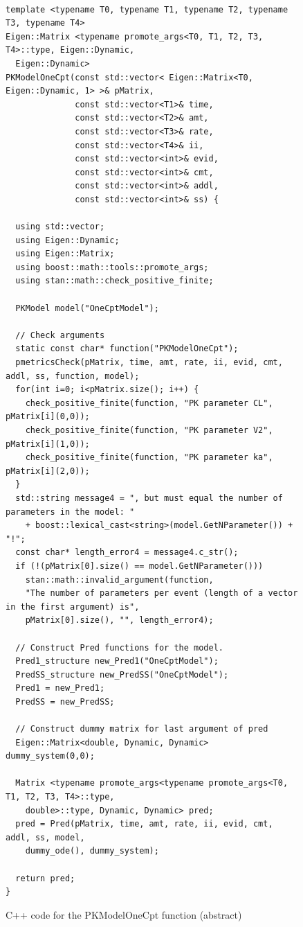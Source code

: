 \documentclass[11pt]{amsart}
\newenvironment{fmpage}[1]
     {\begin{lrbox}{\fmbox}\begin{minipage}{#1}}
     {\end{minipage}\end{lrbox}\fbox{\usebox{\fmbox}}}
\begin{document}
\begin{figure}
\caption{C++ code for the PKModelOneCpt function (abstract)}
\begin{center}
\begin{small}
\begin{fmpage}{\textwidth - .45in}
\begin{lstlisting}[basicstyle=\footnotesize\ttfamily,mathescape=true,flexiblecolumns=true,frame=single,escapeinside=`']

template <typename T0, typename T1, typename T2, typename T3, typename T4> 
Eigen::Matrix <typename promote_args<T0, T1, T2, T3, T4>::type, Eigen::Dynamic,
  Eigen::Dynamic> 
PKModelOneCpt(const std::vector< Eigen::Matrix<T0, Eigen::Dynamic, 1> >& pMatrix, 
			  const std::vector<T1>& time,
			  const std::vector<T2>& amt,
			  const std::vector<T3>& rate,
			  const std::vector<T4>& ii,
			  const std::vector<int>& evid,
			  const std::vector<int>& cmt,
			  const std::vector<int>& addl,
			  const std::vector<int>& ss) {
			  
  using std::vector;
  using Eigen::Dynamic;
  using Eigen::Matrix;
  using boost::math::tools::promote_args;
  using stan::math::check_positive_finite;
  
  PKModel model("OneCptModel"); 
  	 
  // Check arguments
  static const char* function("PKModelOneCpt");
  pmetricsCheck(pMatrix, time, amt, rate, ii, evid, cmt, addl, ss, function, model);
  for(int i=0; i<pMatrix.size(); i++) {
    check_positive_finite(function, "PK parameter CL", pMatrix[i](0,0));
    check_positive_finite(function, "PK parameter V2", pMatrix[i](1,0));
    check_positive_finite(function, "PK parameter ka", pMatrix[i](2,0));
  }
  std::string message4 = ", but must equal the number of parameters in the model: " 
    + boost::lexical_cast<string>(model.GetNParameter()) + "!"; 
  const char* length_error4 = message4.c_str();    
  if (!(pMatrix[0].size() == model.GetNParameter()))
    stan::math::invalid_argument(function,
    "The number of parameters per event (length of a vector in the first argument) is",
    pMatrix[0].size(), "", length_error4);

  // Construct Pred functions for the model.
  Pred1_structure new_Pred1("OneCptModel");
  PredSS_structure new_PredSS("OneCptModel");
  Pred1 = new_Pred1;
  PredSS = new_PredSS; 
  	
  // Construct dummy matrix for last argument of pred
  Eigen::Matrix<double, Dynamic, Dynamic> dummy_system(0,0);

  Matrix <typename promote_args<typename promote_args<T0, T1, T2, T3, T4>::type,
    double>::type, Dynamic, Dynamic> pred;
  pred = Pred(pMatrix, time, amt, rate, ii, evid, cmt, addl, ss, model,
    dummy_ode(), dummy_system);
    
  return pred;
}
\end{lstlisting}
\end{fmpage}
\end{small}
\end{center}
\label{PKModelOneCptCode}
\end{figure}
\end{document}
